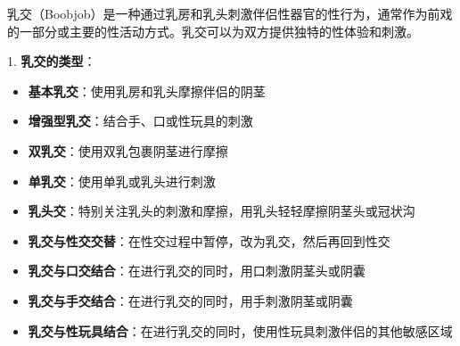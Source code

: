 \documentclass[12pt,UTF8]{ctexbook}
\begin{document}
乳交（Boobjob）是一种通过乳房和乳头刺激伴侣性器官的性行为，通常作为前戏的一部分或主要的性活动方式。乳交可以为双方提供独特的性体验和刺激。

1. \textbf{乳交的类型}：
\begin{itemize}
	\item \textbf{基本乳交}：使用乳房和乳头摩擦伴侣的阴茎
	\item \textbf{增强型乳交}：结合手、口或性玩具的刺激
	\item \textbf{双乳交}：使用双乳包裹阴茎进行摩擦
	\item \textbf{单乳交}：使用单乳或乳头进行刺激
	\item \textbf{乳头交}：特别关注乳头的刺激和摩擦，用乳头轻轻摩擦阴茎头或冠状沟
	\item \textbf{乳交与性交交替}：在性交过程中暂停，改为乳交，然后再回到性交
	\item \textbf{乳交与口交结合}：在进行乳交的同时，用口刺激阴茎头或阴囊
	\item \textbf{乳交与手交结合}：在进行乳交的同时，用手刺激阴茎或阴囊
	\item \textbf{乳交与性玩具结合}：在进行乳交的同时，使用性玩具刺激伴侣的其他敏感区域
\end{itemize}
\end{document}
